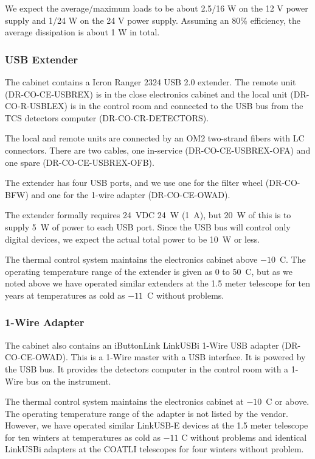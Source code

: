 \documentclass{article}
\begin{document}
We expect the average/maximum loads to be about 2.5/16 W on the 12 V power supply and 1/24 W on the 24 V power supply. Assuming an 80\% efficiency, the average dissipation is about 1 W in total.

\subsubsection{USB Extender}

The cabinet contains a Icron Ranger 2324 USB 2.0 extender. The remote unit (DR-CO-CE-USBREX) is in the close electronics cabinet and the local unit (DR-CO-R-USBLEX) is in the control room and connected to the USB bus from the TCS detectors computer (DR-CO-CR-DETECTORS). 

The local and remote units are connected by an OM2 two-strand fibers with LC connectors. There are two cables, one in-service (DR-CO-CE-USBREX-OFA) and one spare (DR-CO-CE-USBREX-OFB).

The extender has four USB ports, and we use one for the filter wheel (DR-CO-BFW) and one for the 1-wire adapter (DR-CO-CE-OWAD).

The extender formally requires 24~VDC 24~W (1~A), but 20~W of this is to supply 5~W of power to each USB port. Since the USB bus will control only digital devices, we expect the actual total power to be 10~W or less.

The thermal control system maintains the electronics cabinet above $-10$~C. The operating temperature range of the extender is given as 0 to 50~C, but as we noted above we have operated similar extenders at the 1.5 meter telescope for ten years at temperatures as cold as $-11$~C without problems. 

\subsubsection{1-Wire Adapter}

The cabinet also contains an iButtonLink LinkUSBi 1-Wire USB adapter (DR-CO-CE-OWAD). This is a 1-Wire master with a USB interface. It is powered by the USB bus. It provides the detectors computer in the control room with a 1-Wire bus on the instrument.

The thermal control system maintains the electronics cabinet at $-10$~C or above. The operating temperature range of the adapter is not listed by the vendor. However, we have operated similar LinkUSB-E devices at the 1.5 meter telescope for ten winters at temperatures as cold as $-11$ C without problems and identical LinkUSBi adapters at the COATLI telescopes for four winters without problem. 
\end{document}
